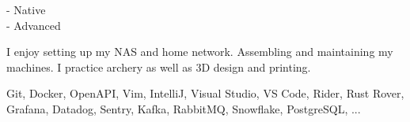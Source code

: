 \documentclass[8pt]{developercv} %
\begin{document}
\vfill %
\begin{minipage}[t]{0.2\textwidth} %
	\vspace{-\baselineskip} %


	 - Native\\
	 - Advanced\\
\end{minipage}
\hfill
\begin{minipage}[t]{0.35\textwidth} %
	\vspace{-\baselineskip} %


	I enjoy setting up my NAS and home network. Assembling and maintaining my machines. I practice archery as well as 3D design and printing.
\end{minipage}
\hfill
\begin{minipage}[t]{0.35\textwidth} %
	\vspace{-\baselineskip} %


	Git, Docker, OpenAPI, Vim, IntelliJ, Visual Studio, VS Code, Rider, Rust Rover, Grafana, Datadog, Sentry, Kafka, RabbitMQ, Snowflake, PostgreSQL, ...
\end{minipage}
\vspace{\baselineskip}
\end{document}
